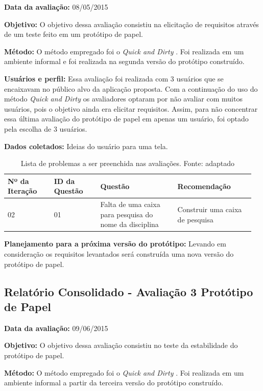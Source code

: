 \textbf{Data da avaliação:} 08/05/2015

\textbf{Objetivo:}
O objetivo dessa avaliação consistiu na elicitação de requisitos através de um teste feito em um protótipo de papel.

\textbf{Método:}
O método empregado foi o \textit{Quick and Dirty} \cite{preece}. Foi realizada em um ambiente informal e foi realizada na segunda versão do protótipo construído.

\textbf{Usuários e perfil:}
Essa avaliação foi realizada com 3 usuários que se encaixavam no público alvo da aplicação proposta. Com a continuação do uso do método \textit{Quick and Dirty} os avaliadores optaram por não avaliar com muitos usuários, pois o objetivo ainda era elicitar requisitos. Assim, para não concentrar essa última avaliação do protótipo de papel em apenas um usuário, foi optado pela escolha de 3 usuários.

\textbf{Dados coletados:}
Ideias do usuário para uma tela.

\begin{table}[!h]
\caption{Lista de problemas a ser preenchida nas avaliações. Fonte: \cite{preece} adaptado}
\label{tab:problema}
  \begin{tabular}{p{0.18\linewidth}p{0.18\linewidth}p{0.30\linewidth}p{0.30\linewidth}}
  \hline
    Nº da Iteração & ID da Questão & Questão & Recomendação\\
 \hline
    02 & 01 & Falta de uma caixa para pesquisa do nome da disciplina & Construir uma caixa de pesquisa\\
  \end{tabular}
\end{table}

\textbf{Planejamento para a próxima versão do protótipo:}
Levando em consideração os requisitos levantados será construída uma nova versão do protótipo de papel.

\vfill
\pagebreak
\subsection{Relatório Consolidado - Avaliação 3 Protótipo de Papel}

\textbf{Data da avaliação:} 09/06/2015

\textbf{Objetivo:}
O objetivo dessa avaliação consistiu no teste da estabilidade do protótipo de papel.

\textbf{Método:}
O método empregado foi o \textit{Quick and Dirty} \cite{preece}. Foi realizada em um ambiente informal a partir da terceira versão do protótipo construído.

